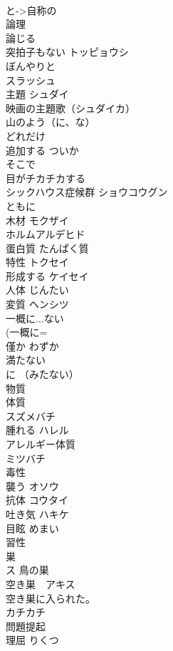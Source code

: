\documentclass[8pt]{extreport}
\begin{document}
\begin{CJK}{UTF8}{min}
\\	と->自称の
\\	論理	
\\	論じる	
\\	突拍子もない	トッピョウシ 
\\	ぼんやりと	
\\	スラッシュ	
\\	主題	シュダイ 
\\	映画の主題歌（シュダイカ） 
\\	山のよう（に、な）	
\\	どれだけ	
\\	追加する	ついか 
\\	そこで	
\\	目がチカチカする	
\\	シックハウス症候群	ショウコウグン 
\\	ともに	
\\	木材	モクザイ 
\\	ホルムアルデヒド	
\\	蛋白質	たんぱく質 
\\	特性	トクセイ 
\\	形成する	ケイセイ 
\\	人体	じんたい 
\\	変質	ヘンシツ 
\\	一概に...ない	
\\	(一概に=
\\	僅か	わずか 
\\	満たない	
\\	に （みたない）
\\	物質	
\\	体質	
\\	スズメバチ	
\\	腫れる	ハレル 
\\	アレルギー体質	
\\	ミツバチ	
\\	毒性	
\\	襲う	オソウ 
\\	抗体	コウタイ 
\\	吐き気	ハキケ 
\\	目眩	めまい 
\\	習性	
\\	巣	
\\	ス 鳥の巣 
\\	空き巣　アキス 
\\	空き巣に入られた。
\\	カチカチ	
\\	問題提起	
\\	理屈	りくつ 

\end{CJK}
\end{document}
